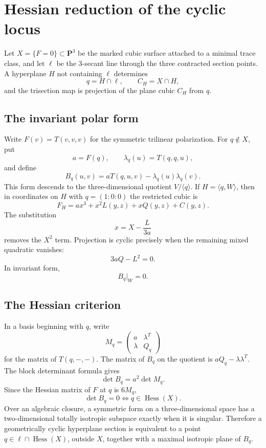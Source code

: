 \section{Hessian reduction of the cyclic locus}

Let $X=\{F=0\}\subset\mathbf P^3$ be the marked cubic surface attached to a
minimal trace class, and let $\ell$ be the 3-secant line through the three
contracted section points.  A hyperplane $H$ not containing $\ell$ determines
\[
q=H\cap\ell,
\qquad
C_H=X\cap H,
\]
and the trisection map is projection of the plane cubic $C_H$ from $q$.

\subsection{The invariant polar form}

Write $F(v)=T(v,v,v)$ for the symmetric trilinear polarization.  For
$q\notin X$, put
\[
a=F(q),
\qquad
\lambda_q(u)=T(q,q,u),
\]
and define
\[
\boxed{
B_q(u,v)
=aT(q,u,v)-\lambda_q(u)\lambda_q(v).
}
\]
This form descends to the three-dimensional quotient $V/\langle q\rangle$.
If $H=\langle q,W\rangle$, then in coordinates on $H$ with
$q=(1:0:0)$ the restricted cubic is
\[
F_H=ax^3+x^2L(y,z)+xQ(y,z)+C(y,z).
\]
The substitution
\[
x=X-\frac{L}{3a}
\]
removes the $X^2$ term.  Projection is cyclic precisely when the remaining
mixed quadratic vanishes:
\[
\boxed{3aQ-L^2=0.}
\]
In invariant form,
\[
\boxed{B_q|_W=0.}
\]

\subsection{The Hessian criterion}

In a basis beginning with $q$, write
\[
M_q=
\begin{pmatrix}
a&\lambda^T\\
\lambda&Q_q
\end{pmatrix}
\]
for the matrix of $T(q,-,-)$.  The matrix of $B_q$ on the quotient is
$aQ_q-\lambda\lambda^T$.  The block determinant formula gives
\[
\boxed{
\det B_q=a^2\det M_q.
}
\]
Since the Hessian matrix of $F$ at $q$ is $6M_q$,
\[
\boxed{
\det B_q=0
\iff q\in\operatorname{Hess}(X).
}
\]
Over an algebraic closure, a symmetric form on a three-dimensional space has
a two-dimensional totally isotropic subspace exactly when it is singular.
Therefore a geometrically cyclic hyperplane section is equivalent to a point
$q\in\ell\cap\operatorname{Hess}(X)$, outside $X$, together with a maximal
isotropic plane of $B_q$.

